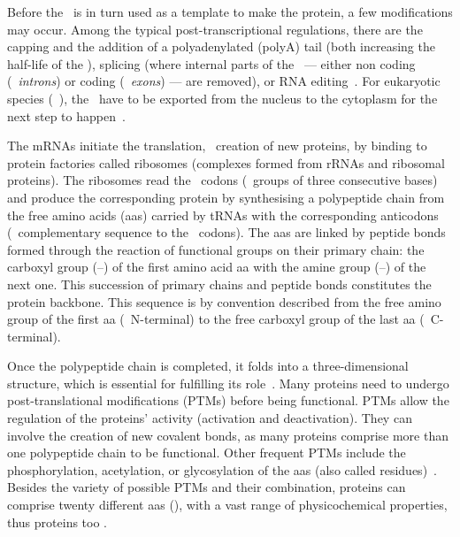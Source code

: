 Before the \mRNA\ is in turn used as a template to make the protein,
a few modifications may occur.
Among the typical post-transcriptional regulations,
there are
the capping and the addition of a polyadenylated (polyA) tail
(both increasing the half-life of the \mRNA),
splicing
(where internal parts of the \mRNA\ ---
either non coding (\ie\ \emph{introns}) or coding (\ie\ \emph{exons}) --- are removed),
or \gls{RNA} editing~.
For eukaryotic species (\eg\ ),
the \mRNAs\ have to be exported
from the nucleus to the cytoplasm for the next step to happen~.

The \glspl{mRNA} initiate the translation,
\ie\ creation of new proteins,
by binding to protein factories called ribosomes
(complexes formed from \glspl{rRNA} and ribosomal proteins).
The ribosomes read the \mRNA\ codons (\ie\ groups of three consecutive bases)
and produce the corresponding protein by synthesising a polypeptide chain
from the free amino acids (\glspl{aa}) carried by \glspl{tRNA}
with the corresponding anticodons (\ie\ complementary sequence to the \mRNA\ codons).
The \glspl{aa} are linked by peptide bonds formed
through the reaction of functional groups on their primary chain:
the carboxyl group (--) of the first amino acid \gls{aa}
with the amine group (--) of the next one.
This succession of primary chains and peptide bonds constitutes
the protein backbone.
This sequence is by convention described
from the free amino group of the first \gls{aa} (\ie\ N-terminal)
to the free carboxyl group of the last \gls{aa} (\ie\ C-terminal).

Once the polypeptide chain is completed,
it folds into a three-dimensional structure,
which is essential for fulfilling its role~.
Many proteins need to undergo post-translational modifications (\glspl{PTM})
before being functional.
\glspl{PTM} allow the regulation of the proteins' activity
(activation and deactivation).
They can involve the creation of new covalent bonds,
as many proteins comprise more than one polypeptide chain to be functional.
Other frequent \glspl{PTM} include the phosphorylation, acetylation,
or glycosylation of the \glspl{aa} (also called residues)~.
Besides the variety of possible \glspl{PTM} and their combination,
proteins can comprise twenty different \glspl{aa} (),
with a vast range of physicochemical properties,
thus proteins too
.

